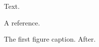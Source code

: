 
Text.
\begin{references}
 A reference.
\end{references}
\begingroup
{} The first figure caption.
\endgroup
After.

